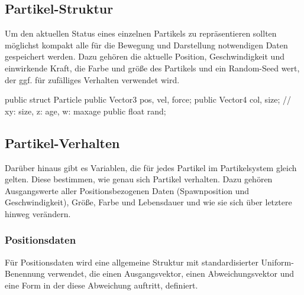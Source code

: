 
\subsection{Partikel-Struktur}

Um den aktuellen Status eines einzelnen Partikels zu repräsentieren sollten möglichst kompakt alle für die Bewegung und Darstellung notwendigen Daten gespeichert werden. Dazu gehören die aktuelle Position, Geschwindigkeit und einwirkende Kraft, die Farbe und grö{\ss}e des Partikels und ein Random-Seed wert, der ggf. für zufälliges Verhalten verwendet wird.

\begin{csh}[caption=Partikelstruktur,label=lst:particle]
public struct Particle
{
    public Vector3 pos, vel, force;
    public Vector4 col, size; // xy: size,  z: age, w: maxage
    public float rand;
}
\end{csh}


\subsection{Partikel-Verhalten}

Darüber hinaus gibt es Variablen, die für jedes Partikel im Partikelsystem gleich gelten. Diese bestimmen, wie genau sich Partikel verhalten. Dazu gehören Ausgangswerte aller Positionsbezogenen Daten (Spawnposition und Geschwindigkeit), Grö{\ss}e, Farbe und Lebensdauer und wie sie sich über letztere hinweg verändern.





\subsubsection{Positionsdaten}

Für Positionsdaten wird eine allgemeine Struktur mit standardisierter Uniform-Benennung verwendet, die einen Ausgangsvektor, einen Abweichungsvektor und eine Form in der diese Abweichung auftritt, definiert.

